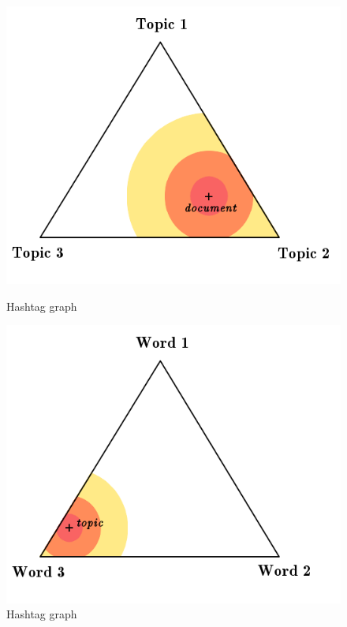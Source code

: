 \documentclass[a4paper,12pt]{report}
\begin{document}
\begin{figure}[H]
\begin{minipage}[t]{0.48\textwidth}
\begin{center}
\includegraphics[width=\textwidth]{images/diags/lda_1.png}
\caption{Hashtag graph}
\label{diri_distri1}
\end{center}
\end{minipage}
\hfill
\begin{minipage}[t]{0.48\textwidth}
\begin{center}
\includegraphics[width=\textwidth]{images/diags/lda_2.png}
\caption{Hashtag graph}
\label{diri_distri2}
\end{center}
\end{minipage}
\end{figure}
\end{document}
